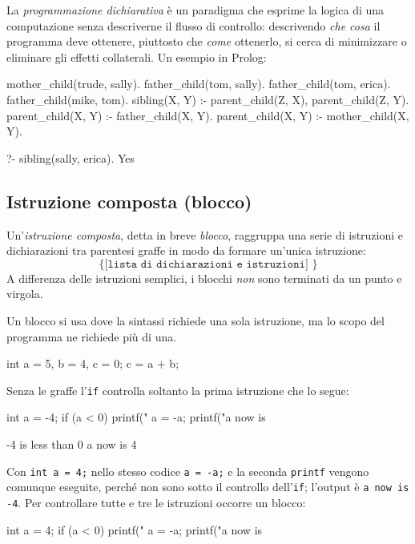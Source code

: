 \documentclass[11pt,a4paper]{article}
\begin{document}
La \emph{programmazione dichiarativa} è un paradigma che esprime la logica di una computazione senza descriverne il flusso di controllo: descrivendo \emph{che cosa} il programma deve ottenere, piuttosto che \emph{come} ottenerlo, si cerca di minimizzare o eliminare gli effetti collaterali. Un esempio in Prolog:
\begin{codice}
mother_child(trude, sally).
father_child(tom, sally).
father_child(tom, erica).
father_child(mike, tom).
sibling(X, Y) :- parent_child(Z, X), parent_child(Z, Y).
parent_child(X, Y) :- father_child(X, Y).
parent_child(X, Y) :- mother_child(X, Y).

?- sibling(sally, erica).
Yes
\end{codice}

\subsection{Istruzione composta (blocco)}

Un'\emph{istruzione composta}, detta in breve \emph{blocco}, raggruppa una serie di istruzioni e dichiarazioni tra parentesi graffe in modo da formare un'unica istruzione:
\[
\texttt{\{ [lista di dichiarazioni e istruzioni] \}}
\]
A differenza delle istruzioni semplici, i blocchi \emph{non} sono terminati da un punto e virgola.

Un blocco si usa dove la sintassi richiede una sola istruzione, ma lo scopo del programma ne richiede più di una.
\begin{codice}
{
    int a = 5, b = 4, c = 0;
    c = a + b;
}
\end{codice}

\begin{esempio}
Senza le graffe l'\lstinline|if| controlla soltanto la prima istruzione che lo segue:
\begin{codice}
int a = -4;
if (a < 0)
    printf("%
    a = -a;
    printf("a now is %
\end{codice}
\begin{risultato}
-4 is less than 0 a now is 4
\end{risultato}
Con \lstinline|int a = 4;| nello stesso codice \lstinline|a = -a;| e la seconda \lstinline|printf| vengono comunque eseguite, perché non sono sotto il controllo dell'\lstinline|if|; l'output è \texttt{a now is -4}. Per controllare tutte e tre le istruzioni occorre un blocco:
\begin{codice}
int a = 4;
if (a < 0) {
    printf("%
    a = -a;
    printf("a now is %
}
\end{codice}
\end{esempio}
\end{document}

